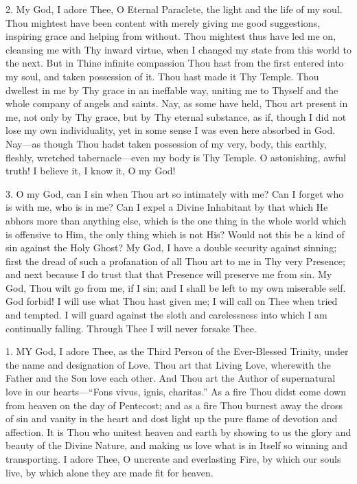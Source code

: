 2. My God, I adore Thee, O
Eternal Paraclete, the light and the life of my soul. Thou mightest have
been content with merely giving me good suggestions, inspiring grace and
helping from without. Thou mightest thus have led me on, cleansing me
with Thy inward virtue, when I changed my state from this world to the
next. But in Thine infinite compassion Thou hast from the first entered
into my soul, and taken possession of it. Thou hast made it Thy Temple.
Thou dwellest in me by Thy grace in an ineffable way, uniting me to
Thyself and the whole company of angels and saints. Nay, as some have
held, Thou art present in me, not only by Thy grace, but by Thy eternal
substance, as if, though I did not lose my own individuality, yet in
some sense I was even here absorbed in God. Nay—as though Thou hadst
taken possession of my very, body, this earthly, fleshly, wretched
tabernacle—even my body is Thy Temple. O astonishing, awful truth! I
believe it, I know it, O my God!

3. O my God, can I sin when Thou
art so intimately with me? Can I forget who is with me, who is in
me? Can I expel a Divine Inhabitant by that which He abhors more than
anything else, which is the one thing in the whole world which is
offensive to Him, the only thing which is not His? Would not this be a
kind of sin against the Holy Ghost? My God, I have a double security
against sinning; first the dread of such a profanation of all Thou art
to me in Thy very Presence; and next because I do trust that that
Presence will preserve me from sin. My God, Thou wilt go from me, if I
sin; and I shall be left to my own miserable self. God forbid! I will
use what Thou hast given me; I will call on Thee when tried and tempted.
I will guard against the sloth and carelessness into which I am
continually falling. Through Thee I will never forsake Thee.


1. MY
God, I adore Thee, as the Third Person of the Ever-Blessed Trinity,
under the name and designation of Love. Thou art that Living Love,
wherewith the Father and the Son love each other. And Thou art the
Author of supernatural love in our hearts—``Fons vivus, ignis, charitas.''
As a fire Thou didst come down from heaven on the day of Pentecost; and
as a fire Thou burnest away the dross of sin and vanity in the heart and
dost light up the pure flame of devotion and affection. It is Thou who
unitest heaven and earth by showing to us the glory and beauty of the
Divine Nature, and making us love what is in Itself so winning and
transporting. I adore Thee, O uncreate and everlasting Fire, by which
our souls live, by which alone they are made fit for heaven.

